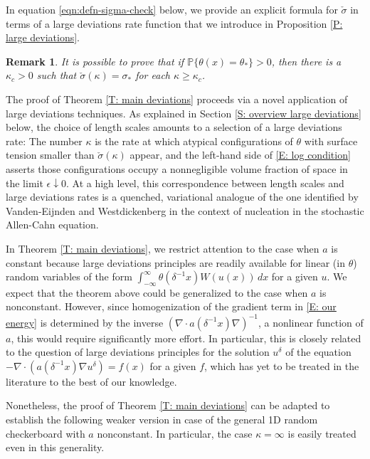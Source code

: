 \documentclass[10pt,a4paper]{amsart}
\newtheorem{remark}{Remark}
\begin{document}
In equation \eqref{eqn:defn-sigma-check} below, we provide an explicit formula for $ \check\sigma $ in terms of a large deviations rate function that we introduce in Proposition \ref{P: large deviations}.

	\begin{remark} \label{R: eventually constant} It is possible to prove that if $\mathbb{P} \{ \theta(x) = \theta_{*} \} > 0$, then there is a $\kappa_{c} > 0$ such that $\check{\sigma}(\kappa) = \sigma_{*}$ for each $\kappa \geq \kappa_{c}$. \end{remark}
	
The proof of Theorem \ref{T: main deviations} proceeds via a novel application of large deviations techniques.  As explained in Section \ref{S: overview large deviations} below, the choice of length scales amounts to a selection of a large deviations rate: The number $\kappa$ is the rate at which atypical configurations of $\theta$ with surface tension smaller than $\check{\sigma}(\kappa)$ appear, and the left-hand side of \eqref{E: log condition} asserts those configurations occupy a nonnegligible volume fraction of space in the limit $\epsilon \downarrow 0$.    At a high level, this correspondence between length scales and large deviations rates is a quenched, variational analogue of the one identified by Vanden-Eijnden and Westdickenberg \cite{vanden-eijnden_westdickenberg} in the context of nucleation in the stochastic Allen-Cahn equation.

In Theorem \ref{T: main deviations}, we restrict attention to the case when $a$ is constant because large deviations principles are readily available for linear (in $\theta$) random variables of the form $\int_{-\infty}^{\infty} \theta(\delta^{-1} x) W(u(x)) \, dx$ for a given $u$.  We expect that the theorem above could be generalized to the case when $a$ is nonconstant.  However, since homogenization of the gradient term in \eqref{E: our energy} is determined by the inverse $( \nabla \cdot a(\delta^{-1} x) \nabla )^{-1}$, a nonlinear function of $a$, this would require significantly more effort.  In particular, this is closely related to the question of large deviations principles for the solution $u^{\delta}$ of the equation $-\nabla \cdot ( a ( \delta^{-1} x ) \nabla u^{\delta} ) = f(x)$ for a given $f$, which has yet to be treated in the literature to the best of our knowledge.

Nonetheless, the proof of Theorem \ref{T: main deviations} can be adapted to establish the following weaker version in case of the general 1D random checkerboard with $a$ nonconstant.  In particular, the case $\kappa =  \infty$ is easily treated even in this generality.
\end{document}

